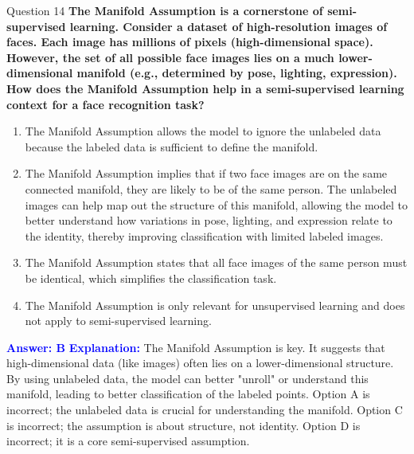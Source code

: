 \documentclass{beamer}
\begin{document}
	\begin{frame}{Question 14}
		\textbf{The Manifold Assumption is a cornerstone of semi-supervised learning. Consider a dataset of high-resolution images of faces. Each image has millions of pixels (high-dimensional space). However, the set of all possible face images lies on a much lower-dimensional manifold (e.g., determined by pose, lighting, expression). How does the Manifold Assumption help in a semi-supervised learning context for a face recognition task?}
		\begin{enumerate}
			\item The Manifold Assumption allows the model to ignore the unlabeled data because the labeled data is sufficient to define the manifold.
			\item The Manifold Assumption implies that if two face images are on the same connected manifold, they are likely to be of the same person. The unlabeled images can help map out the structure of this manifold, allowing the model to better understand how variations in pose, lighting, and expression relate to the identity, thereby improving classification with limited labeled images.
			\item The Manifold Assumption states that all face images of the same person must be identical, which simplifies the classification task.
			\item The Manifold Assumption is only relevant for unsupervised learning and does not apply to semi-supervised learning.
		\end{enumerate}
		\vspace{0.2cm}
		\textcolor{blue}{\textbf{Answer: B}}
		\vspace{0.2cm}
		\textcolor{blue}{\textbf{Explanation:}} The Manifold Assumption is key. It suggests that high-dimensional data (like images) often lies on a lower-dimensional structure. By using unlabeled data, the model can better "unroll" or understand this manifold, leading to better classification of the labeled points. Option A is incorrect; the unlabeled data is crucial for understanding the manifold. Option C is incorrect; the assumption is about structure, not identity. Option D is incorrect; it is a core semi-supervised assumption.
	\end{frame}
	
\end{document}
